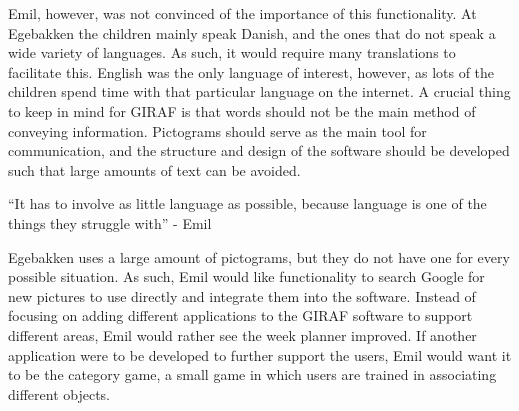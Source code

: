 Emil, however, was not convinced of the importance of this functionality.
At Egebakken the children mainly speak Danish, and the ones that do not speak a wide variety of languages.
As such, it would require many translations to facilitate this.
English was the only language of interest, however, as lots of the children spend time with that particular language on the internet.
A crucial thing to keep in mind for GIRAF is that words should not be the main method of conveying information.
Pictograms should serve as the main tool for communication, and the structure and design of the software should be developed such that large amounts of text can be avoided.
\begin{displayquote}
    ``It has to involve as little language as possible, because language is one of the things they struggle with'' - Emil
\end{displayquote}
Egebakken uses a large amount of pictograms, but they do not have one for every possible situation.
As such, Emil would like functionality to search Google for new pictures to use directly and integrate them into the software.
Instead of focusing on adding different applications to the GIRAF software to support different areas, Emil would rather see the week planner improved.
If another application were to be developed to further support the users, Emil would want it to be the category game, a small game in which users are trained in associating different objects.
